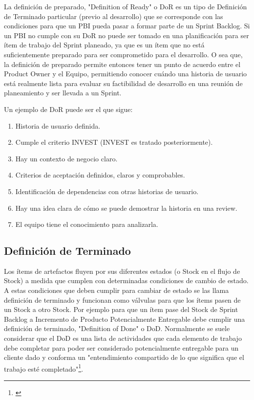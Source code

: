 La definición de preparado, "Definition of Ready" o DoR es un tipo de Definición de Terminado particular (previo al desarrollo) que se corresponde con las condiciones para que un PBI pueda pasar a formar parte de un Sprint Backlog. Si un PBI no cumple con su DoR no puede ser tomado en una planificación para ser ítem de trabajo del Sprint planeado, ya que es un ítem que no está suficientemente preparado para ser comprometido para el desarrollo. O sea que, la definición de preparado permite entonces tener un punto de acuerdo entre el Product Owner y el Equipo, permitiendo conocer cuándo una historia de usuario está realmente lista para evaluar su factibilidad de desarrollo en una reunión de planeamiento y ser llevada a un Sprint.

Un ejemplo de DoR puede ser el que sigue:

\begin{enumerate}
\item{Historia de usuario definida.}
\item{Cumple el criterio INVEST (INVEST es tratado posteriormente).}
\item{Hay un contexto de negocio claro.}
\item{Criterios de aceptación definidos, claros y comprobables.}
\item{Identificación de dependencias con otras historias de usuario.}
\item{Hay una idea clara de cómo se puede demostrar la historia en una review.}
\item{El equipo tiene el conocimiento para analizarla.}
\end{enumerate}

\subsection{Definición de Terminado}

Los ítems de artefactos fluyen por sus diferentes estados (o Stock en el flujo de Stock) a medida que cumplen con determinadas condiciones de cambio de estado. A estas condiciones que deben cumplir para cambiar de estado se las llama definición de terminado y funcionan como válvulas para que los ítems pasen de un Stock a otro Stock. Por ejemplo para que un ítem pase del Stock de Sprint Backlog a Incremento de Producto Potencialmente Entregable debe cumplir una definición de terminado, "Definition of Done" o DoD. Normalmente se suele considerar que el DoD es una lista de actividades que cada elemento de trabajo debe completar para poder ser considerado potencialmente entregable para un cliente dado y conforma un "entendimiento compartido de lo que significa que el trabajo esté completado"\footnote{\cite{Ken-Jeff-2013}}.

